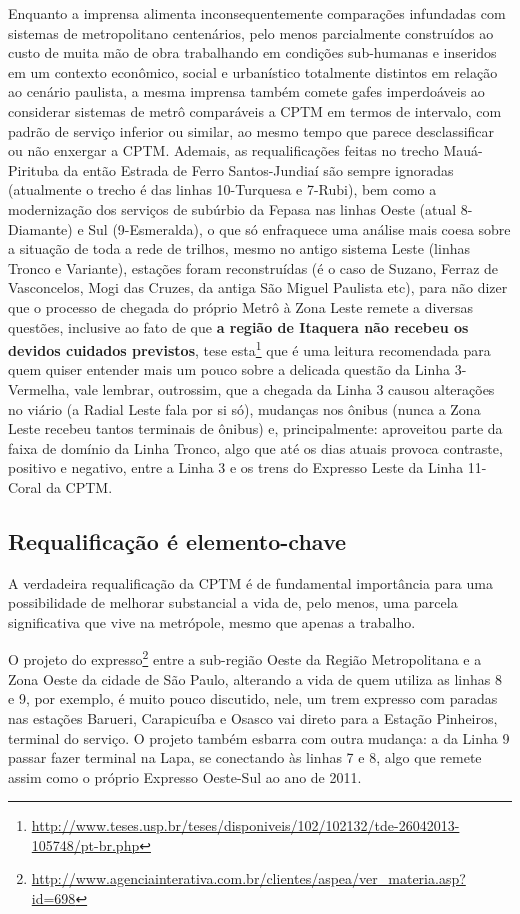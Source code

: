 \documentclass[11pt,fleqn]{book} %
\begin{document}
Enquanto a imprensa alimenta inconsequentemente comparações infundadas com sistemas de metropolitano centenários, pelo menos parcialmente construídos ao custo de muita mão de obra trabalhando em condições sub-humanas e inseridos em um contexto econômico, social e urbanístico totalmente distintos em relação ao cenário paulista, a mesma imprensa também comete gafes imperdoáveis ao considerar sistemas de metrô comparáveis a CPTM em termos de intervalo, com padrão de serviço inferior ou similar, ao mesmo tempo que parece desclassificar ou não enxergar a CPTM. Ademais, as requalificações feitas no trecho Mauá-Pirituba da então Estrada de Ferro Santos-Jundiaí são sempre ignoradas (atualmente o trecho é das linhas 10-Turquesa e 7-Rubi), bem como a modernização dos serviços de subúrbio da Fepasa nas linhas Oeste (atual 8-Diamante) e Sul (9-Esmeralda), o que só enfraquece uma análise mais coesa sobre a situação de toda a rede de trilhos, mesmo no antigo sistema Leste (linhas Tronco e Variante), estações foram reconstruídas (é o caso de Suzano, Ferraz de Vasconcelos, Mogi das Cruzes, da antiga São Miguel Paulista etc), para não dizer que o processo de chegada do próprio Metrô à Zona Leste remete a diversas questões, inclusive ao fato de que \textbf{a região de Itaquera não recebeu os devidos cuidados previstos}, tese esta\footnote{\url{http://www.teses.usp.br/teses/disponiveis/102/102132/tde-26042013-105748/pt-br.php}} que é uma leitura recomendada para quem quiser entender mais um pouco sobre a delicada questão da Linha 3-Vermelha, vale lembrar, outrossim, que a chegada da Linha 3 causou alterações no viário (a Radial Leste fala por si só), mudanças nos ônibus (nunca a Zona Leste recebeu tantos terminais de ônibus) e, principalmente: aproveitou parte da faixa de domínio da Linha Tronco, algo que até os dias atuais provoca contraste, positivo e negativo, entre a Linha 3 e os trens do Expresso Leste da Linha 11-Coral da CPTM.

\subsection{Requalificação é elemento-chave}

A verdadeira requalificação da CPTM é de fundamental importância para uma possibilidade de melhorar substancial a vida de, pelo menos, uma parcela significativa que vive na metrópole, mesmo que apenas a trabalho.

O projeto do expresso\footnote{\url{http://www.agenciainterativa.com.br/clientes/aspea/ver_materia.asp?id=698}} entre a sub-região Oeste da Região Metropolitana e a Zona Oeste da cidade de São Paulo, alterando a vida de quem utiliza as linhas 8 e 9, por exemplo, é muito pouco discutido, nele, um trem expresso com paradas nas estações Barueri, Carapicuíba e Osasco vai direto para a Estação Pinheiros, terminal do serviço. O projeto também esbarra com outra mudança: a da Linha 9 passar fazer terminal na Lapa, se conectando às linhas 7 e 8, algo que remete assim como o próprio Expresso Oeste-Sul ao ano de 2011.
\end{document}
